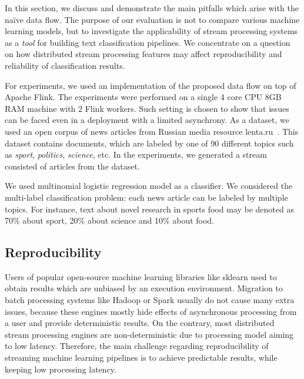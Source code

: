 \label {fs-discussion}

In this section, we discuss and demonstrate the main pitfalls which arise with the na\"ive data flow. The purpose of our evaluation is not to compare various machine learning models, but to investigate the applicability of stream processing systems as a {\em tool} for building text classification pipelines. We concentrate on a question on how distributed stream processing features may affect reproducibility and reliability of classification results.

For experiments, we used an implementation of the proposed data flow on top of Apache Flink. The experiments were performed on a single 4 core CPU 8GB RAM machine with 2 Flink workers. Such setting is chosen to show that issues can be faced even in a deployment with a limited asynchrony. As a dataset, we used an open corpus of news articles from Russian media resource lenta.ru~\cite{lentaru}. This dataset contains documents, which are labeled by one of 90 different topics such as {\em sport}, {\em politics}, {\em science}, etc. In the experiments, we generated a stream consisted of articles from the dataset.

We used multinomial logistic regression model as a classifier. We considered the multi-label classification problem: each news article can be labeled by multiple topics. For instance, text about novel research in sports food may be denoted as 70\% about sport, 20\% about science and 10\% about food. 

\subsection{Reproducibility}

Users of popular open-source machine learning libraries like sklearn used to obtain results which are unbiased by an execution environment. Migration to batch processing systems like Hadoop or Spark usually do not cause many extra issues, because these engines mostly hide effects of asynchronous processing from a user and provide deterministic results. On the contrary, most distributed stream processing engines are non-deterministic due to processing model aiming to low latency. Therefore, the main challenge regarding reproducibility of streaming machine learning pipelines is to achieve predictable results, while keeping low processing latency. 

